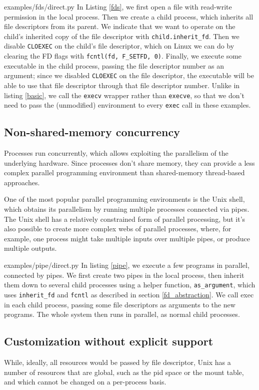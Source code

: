 \documentclass[letterpaper,twocolumn,10pt]{article}
\begin{document}

{examples/fds/direct.py}
In Listing \ref{fds},
we first open a file with read-write permission in the local process.
Then we create a child process,
which inherits all file descriptors from its parent.
We indicate that we want to operate on the child's inherited copy of the file descriptor with \verb|child.inherit_fd|.
Then we disable \texttt{CLOEXEC} on the child's file descriptor,
which on Linux we can do by clearing the FD flags with \verb|fcntl(fd, F_SETFD, 0)|.
Finally, we execute some executable in the child process,
passing the file descriptor number as an argument;
since we disabled \texttt{CLOEXEC} on the file descriptor,
the executable will be able to use that file descriptor through that file descriptor number.
Unlike in listing \ref{basic}, we call the \texttt{execv} wrapper rather than \texttt{execve},
so that we don't need to pass the (unmodified) environment to every \texttt{exec} call in these examples.
\subsection{Non-shared-memory concurrency}
Processes run concurrently,
which allows exploiting the parallelism of the underlying hardware.
Since processes don't share memory,
they can provide a less complex parallel programming environment
than shared-memory thread-based approaches.

One of the most popular parallel programming environments is the Unix shell,
which obtains its parallelism by running multiple processes connected via pipes.
The Unix shell has a relatively constrained form of parallel processing,
but it's also possible to create more complex webs of parallel processes,
where, for example, one process might take multiple inputs over multiple pipes,
or produce multiple outputs.


{examples/pipe/direct.py}
In listing \ref{pipe},
we execute a few programs in parallel,
connected by pipes.
We first create two pipes in the local process,
then inherit them down to several child processes using a helper function, \verb|as_argument|,
which uses \verb|inherit_fd| and \texttt{fcntl} as described in section \ref{fd_abstraction}.
We call exec in each child process, passing some file descriptors as arguments to the new programs.
The whole system then runs in parallel,
as normal child processes.
\subsection{Customization without explicit support}
While, ideally, all resources would be passed by file descriptor\cite{capsicum},
Unix has a number of resources that are global,
such as the pid space or the mount table,
and which cannot be changed on a per-process basis.
\end{document}
